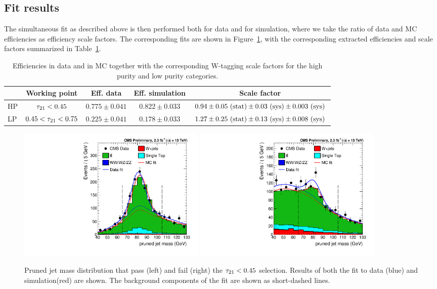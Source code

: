 \subsection{Fit results}
The simultaneous fit as described above is then performed both for data and for simulation, where we take the ratio of data and MC efficiencies as efficiency scale factors. The corresponding fits are shown in Figure~\ref{fig:searchII:simfit}, with the corresponding extracted efficiencies and scale factors summarized in Table~\ref{tab:searchI:WtagSFs}.
\begin{table}[h!]
   \centering
   \footnotesize
   \begin{tabular}{ l | c | c | c | c }
    & Working point & Eff. data & Eff. simulation & Scale factor\\
   \hline
   HP&$\tau_{21} < 0.45$& $0.775 \pm 0.041 $& $0.822 \pm 0.033$ &$0.94 \pm 0.05~\rm{(stat)} \pm 0.03~\rm{(sys)} \pm 0.003~\rm{(sys)}$\\
   LP&$0.45 < \tau_{21} < 0.75$& $0.225 \pm 0.041 $& $0.178 \pm 0.033$ &$1.27 \pm 0.25~\rm{(stat)} \pm 0.13~\rm{(sys)} \pm 0.008~\rm{(sys)}$\\
   \hline
   \end{tabular}
   \caption{Efficiencies in data and in MC together with the corresponding W-tagging scale factors for the high purity and low purity categories. }
   \label{tab:searchI:WtagSFs}
\end{table}
\begin{figure}[h!]
\centering
\includegraphics[width=0.44\textwidth]{figures/vtagging/AN-16-215/_HP0v45powheg_76X_em_pTbin_200_5000.pdf}
\includegraphics[width=0.44\textwidth]{figures/vtagging/AN-16-215/_HP0v45powheg_76X_em_fail_pTbin_200_5000.pdf} \\
\caption{Pruned jet mass distribution that pass (left) and fail (right) the $\tau_{21} < 0.45$ selection. Results of both the fit to data (blue) and simulation(red) are shown. The background components of the fit are shown as short-dashed lines.}
\label{fig:searchII:simfit}
\end{figure}
